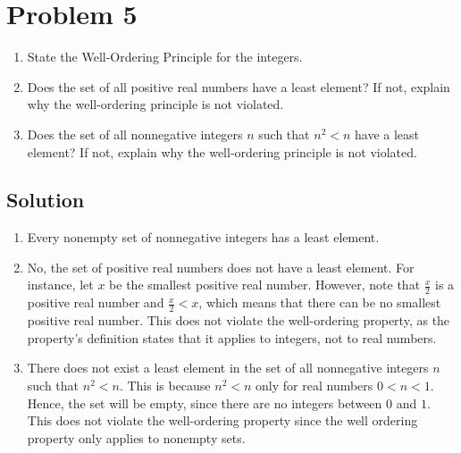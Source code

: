 \documentclass[table]{article}
\begin{document}
\section{Problem 5}
\begin{enumerate}[nosep,label=\alph*)]
\item State the Well-Ordering Principle for the integers.
\item Does the set of all positive real numbers have a least element? If not, explain why the well-ordering principle is not violated.
\item Does the set of all nonnegative integers $n$ such that $n^2 < n$ have a least element? If not, explain why the well-ordering principle is not violated.
\end{enumerate}
\subsection{Solution}
\begin{enumerate}[nosep,label=\alph*)]
\item Every nonempty set of nonnegative integers has a least element.
\item No, the set of positive real numbers does not have a least element. For instance, let $x$ be the smallest positive real number. However, note that $\frac{x}{2}$ is a positive real number and $\frac{x}{2} < x$, which means that there can be no smallest positive real number. This does not violate the well-ordering property, as the property's definition states that it applies to integers, not to real numbers.
\item There does not exist a least element in the set of all nonnegative integers $n$ such that $n^2 < n$. This is because $n^2<n$ only for real numbers $0 < n < 1$. Hence, the set will be empty, since there are no integers between $0$ and $1$. This does not violate the well-ordering property since the well ordering property only applies to nonempty sets.
\end{enumerate}
\end{document}
